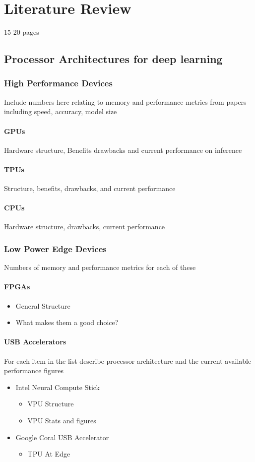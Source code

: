 \chapter{Literature Review}
\label{LiteratureReview}
15-20 pages
\section{Processor Architectures for deep learning}

\subsection{High Performance Devices}
Include numbers here relating to memory and performance metrics from papers including speed, accuracy, model size
\subsubsection{GPUs}
Hardware structure, Benefits drawbacks and current performance on inference
\subsubsection{TPUs}
Structure, benefits, drawbacks, and current performance
\subsubsection{CPUs}
Hardware structure, drawbacks, current performance

\subsection{Low Power Edge Devices}
Numbers of memory and performance metrics for each of these
\subsubsection{FPGAs}
\begin{itemize}
\item
General Structure
\item
What makes them a good choice?
\end{itemize}

\subsubsection{USB Accelerators}
For each item in the list describe processor architecture and the current available performance figures
\begin{itemize}
\item
Intel Neural Compute Stick 
\begin{itemize}
\item
VPU Structure
\item
VPU Stats and figures
\end{itemize}
\item
Google Coral USB Accelerator
\begin{itemize}
\item
TPU At Edge

\end{itemize}
\end{itemize}

